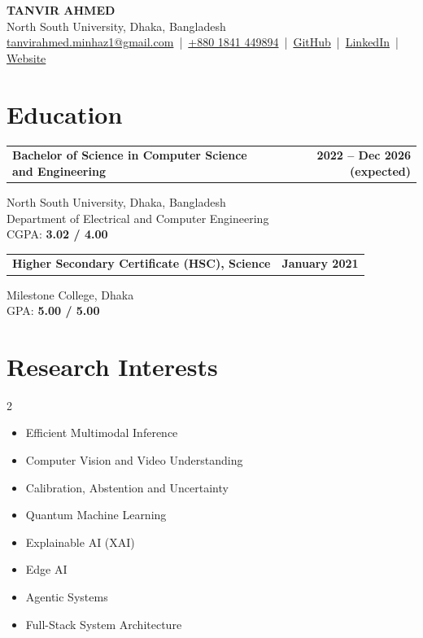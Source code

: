 \documentclass[11pt,letterpaper]{article}
\makeatletter
\newcommand{\entryhead}[2]{\par\vspace{3pt}\noindent%
  \begin{tabular*}{\textwidth}[t]{@{}>{\raggedright\arraybackslash}p{0.73\textwidth}@{\extracolsep{\fill}}r@{}}
    \textbf{#1} & #2
  \end{tabular*}\par\vspace{-1pt}}
\newcommand{\entry}[2]{\entryhead{#1}{\textbf{#2}}}
\newcommand{\gap}{\par\vspace{3pt}}
\makeatother
\begin{document}
\begin{center}
  {\LARGE\bfseries TANVIR AHMED}\\[5pt]
  North South University, Dhaka, Bangladesh\\[2pt]
  \href{mailto:tanvirahmed.minhaz1@gmail.com}{tanvirahmed.minhaz1@gmail.com} \,|\,
  \href{tel:+8801841449894}{+880 1841 449894} \,|\,
  \href{https://github.com/minhaz-42}{GitHub} \,|\,
  \href{https://www.linkedin.com/in/tanvir-ahmed-1a4856418/}{LinkedIn} \,|\,
  \href{https://minhaz-42.github.io/Tanvir-Ahmed/}{Website}
\end{center}

\section{Education}
\entry{Bachelor of Science in Computer Science and Engineering}{2022 -- Dec 2026 (expected)}
North South University, Dhaka, Bangladesh\\
Department of Electrical and Computer Engineering\\
CGPA: \textbf{3.02 / 4.00}
\gap
\entry{Higher Secondary Certificate (HSC), Science}{January 2021}
Milestone College, Dhaka\\
GPA: \textbf{5.00 / 5.00}

\section{Research Interests}
\begin{multicols}{2}
\begin{itemize}[topsep=0pt]
  \item Efficient Multimodal Inference
  \item Computer Vision and Video Understanding
  \item Calibration, Abstention and Uncertainty
  \item Quantum Machine Learning
  \item Explainable AI (XAI)
  \item Edge AI
  \item Agentic Systems
  \item Full-Stack System Architecture
\end{itemize}
\end{multicols}
\end{document}
